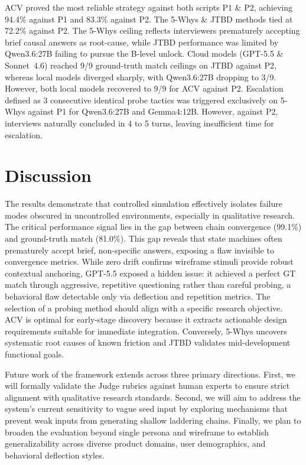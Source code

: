 \documentclass[sigconf,authordraft]{acmart}
\begin{document}
ACV proved the most reliable strategy against both scripts P1 \& P2, achieving 94.4\% against P1 and 83.3\% against P2. The 5-Whys \& JTBD methods tied at 72.2\% against P2. The 5-Whys ceiling reflects interviewers prematurely accepting brief causal answers as root-cause, while JTBD performance was limited by Qwen3.6:27B failing to pursue the B-level unlock. Cloud models (GPT-5.5 \& Sonnet~4.6) reached 9/9 ground-truth match ceilings on JTBD against P2, whereas local models diverged sharply, with Qwen3.6:27B dropping to 3/9. However, both local models recovered to 9/9 for ACV against P2. Escalation defined as 3 consecutive identical probe tactics was triggered exclusively on 5-Whys against P1 for Qwen3.6:27B and Gemma4:12B. However, against P2, interviews naturally concluded in 4 to 5 turns, leaving insufficient time for escalation.
 
 \section{Discussion}
The results demonstrate that controlled simulation effectively isolates failure modes obscured in uncontrolled environments, especially in qualitative research. The critical performance signal lies in the gap between chain convergence (99.1\%) and ground-truth match (81.0\%). This gap reveals that state machines often prematurely accept brief, non-specific answers, exposing a flaw invisible to convergence metrics. While zero drift confirms wireframe stimuli provide robust contextual anchoring, GPT-5.5 exposed a hidden issue: it achieved a perfect GT match through aggressive, repetitive questioning rather than careful probing, a behavioral flaw detectable only via deflection and repetition metrics. The selection of a probing method should align with a specific research objective. ACV is optimal for early-stage discovery because it extracts actionable design requirements suitable for immediate integration. Conversely, 5-Whys uncovers systematic root causes of known friction and JTBD validates mid-development functional goals. 

Future work of the framework extends across three primary directions. First, we will formally validate the Judge rubrics against human experts to ensure strict alignment with qualitative research standards. Second, we will aim to address the system's current sensitivity to vague seed input by exploring mechanisms that prevent weak inputs from generating shallow laddering chains. Finally, we plan to broaden the evaluation beyond single persona and wireframe to establish generalizability across diverse product domains, user demographics, and behavioral deflection styles.
\end{document}
